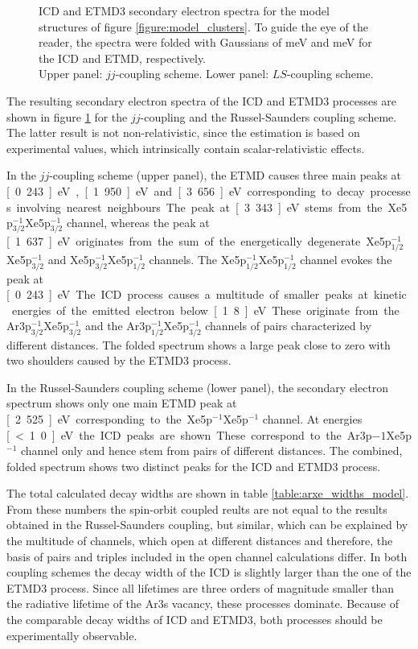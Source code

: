 \begin{figure}[]
 \centering
 
 
 \caption{\ac{ICD} and \ac{ETMD}3 secondary electron spectra for the model
          structures of figure \ref{figure:model_clusters}. To guide the
          eye of the reader, the spectra
          were folded with Gaussians of \unit[300]{meV} and \unit[600]{meV}
          for the \ac{ICD} and \ac{ETMD}, respectively.\\
          Upper panel: $jj$-coupling scheme. Lower panel: $LS$-coupling scheme.}
 \label{figure:arxe_model}
\end{figure}

The resulting secondary electron spectra of the \ac{ICD} and
\ac{ETMD}3 processes are shown in figure \ref{figure:arxe_model} for the
$jj$-coupling and the Russel-Saunders coupling scheme. The latter result is
not non-relativistic, since the estimation is based on experimental values,
which intrinsically contain scalar-relativistic effects.

In the $jj$-coupling scheme (upper panel), the \ac{ETMD} causes three main
peaks at \unit[0.243]{eV}, \unit[1.950]{eV} and \unit[3.656]{eV}
corresponding to decay
processes involving nearest neighbours. The peak at \unit[3.343]{eV} stems
from the Xe5p$_{3/2}^{-1}$Xe5p$_{3/2}^{-1}$ channel, whereas the peak
at \unit[1.637]{eV} originates from the sum of the energetically degenerate
Xe5p$_{1/2}^{-1}$Xe5p$_{3/2}^{-1}$ and Xe5p$_{3/2}^{-1}$Xe5p$_{1/2}^{-1}$
channels. The Xe5p$_{1/2}^{-1}$Xe5p$_{1/2}^{-1}$ channel evokes the peak
at \unit[0.243]{eV}.
The \ac{ICD} process causes a multitude of smaller peaks at kinetic
energies of the emitted electron below \unit[1.8]{eV}. These originate from the
Ar3p$_{3/2}^{-1}$Xe5p$_{3/2}^{-1}$ and the Ar3p$_{1/2}^{-1}$Xe5p$_{3/2}^{-1}$
channels of pairs characterized by different distances.
The folded spectrum shows a large peak close to zero with two shoulders
caused by the \ac{ETMD}3 process.

In the Russel-Saunders coupling scheme (lower panel), the secondary
electron spectrum shows only one main \ac{ETMD} peak at \unit[2.525]{eV}
corresponding to the Xe5p$^{-1}$Xe5p$^{-1}$ channel.
At energies \unit[<1.0]{eV} the \ac{ICD} peaks are shown. These correspond
to the Ar3p${-1}$Xe5p$^{-1}$ channel only and hence stem from pairs of
different distances.
The combined, folded spectrum shows two distinct peaks for the \ac{ICD} and
\ac{ETMD}3 process.

The total calculated decay widths are shown in table
\ref{table:arxe_widths_model}. From these numbers the spin-orbit coupled
reults are not equal to the results obtained in the Russel-Saunders coupling,
but similar, which can be explained by the multitude of channels, which
open at different distances and therefore, the basis of pairs and triples
included in the open channel calculations differ. In both coupling schemes
the decay width of the \ac{ICD} is slightly larger than the one of the
\ac{ETMD}3 process. Since all lifetimes are three orders of magnitude smaller
than the radiative lifetime of the Ar3s vacancy, these processes dominate.
Because of the comparable decay widths of \ac{ICD} and \ac{ETMD}3, both
processes should be experimentally observable.

